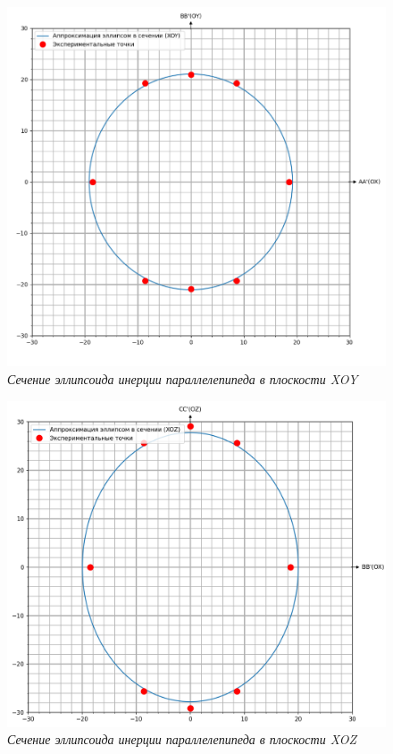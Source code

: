 \documentclass[a4paper, 12pt]{article}
\begin{document}
\newpage

\begin{figure}[h!]
    \includegraphics[width=1\textwidth]{xoy.png}
    \caption{\textit{Сечение эллипсоида инерции параллелепипеда в плоскости XOY}}
    \label{xoy}
\end{figure}

\begin{figure}[h!]
    \includegraphics[width=1\textwidth]{xoz.png}
    \caption{\textit{Сечение эллипсоида инерции параллелепипеда в плоскости XOZ}}
    \label{xoz}
\end{figure}
\end{document}
